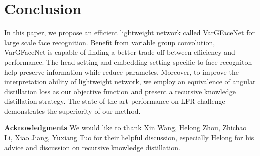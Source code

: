\documentclass[10pt,twocolumn,letterpaper]{article}
\begin{document}
\section{Conclusion}
In this paper, we propose an efficient lightweight network called VarGFaceNet for large scale face recognition. Benefit from variable group convolution, VarGFaceNet is capable of finding a better trade-off between efficiency and performance. The head setting and embedding setting specific to face recogniton help preserve information while reduce parametes. Moreover, to improve the interpretation ability of lightweight network, we employ an equivalence of angular distillation loss as our objective function and present a recursive knowledge distillation strategy. The state-of-the-art performance on LFR challenge demonstrates the superiority of our method.


\textbf{Acknowledgments} We would like to thank Xin Wang, Helong Zhou, Zhichao Li, Xiao Jiang, Yuxiang Tuo for their helpful discussion, especially Helong for his advice and discussion on recursive knowledge distillation.

{\small


}
\end{document}
